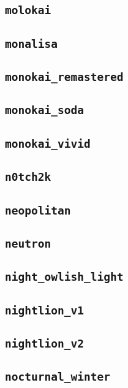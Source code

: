 \subsection{\texttt{molokai}}
\newpage
\subsection{\texttt{monalisa}}
\newpage
\subsection{\texttt{monokai\_remastered}}
\newpage
\subsection{\texttt{monokai\_soda}}
\newpage
\subsection{\texttt{monokai\_vivid}}
\newpage
\subsection{\texttt{n0tch2k}}
\newpage
\subsection{\texttt{neopolitan}}
\newpage
\subsection{\texttt{neutron}}
\newpage
\subsection{\texttt{night\_owlish\_light}}
\newpage
\subsection{\texttt{nightlion\_v1}}
\newpage
\subsection{\texttt{nightlion\_v2}}
\newpage
\subsection{\texttt{nocturnal\_winter}}
\newpage
